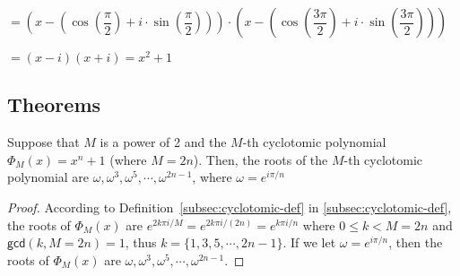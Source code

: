 $= \left(x - \left(\cos\left(\dfrac{\pi}{2}\right) + i \cdot \sin\left(\dfrac{\pi}{2}\right) \right) \right) \cdot \left(x - \left(\cos\left(\dfrac{3\pi}{2}\right) + i \cdot \sin\left(\dfrac{3\pi}{2}\right) \right) \right)$

$= (x - i)(x + i) = x^2 + 1$



\subsection{Theorems}
\label{subsec:cyclotomic-theorem}


\begin{tcolorbox}[title={\textbf{\tboxtheorem{\ref*{subsec:cyclotomic-theorem}.1} Roots of the $M$-th Cyclotomic Polynomial}}]

Suppose that $M$ is a power of 2 and the $M$-th cyclotomic polynomial $\Phi_M(x) = x^n + 1$ (where $M = 2n$). Then, the roots of the $M$-th cyclotomic polynomial are $\omega, \omega^3, \omega^5, \cdots, \omega^{2n-1}$, where $\omega = e^{i\pi/n}$

\end{tcolorbox}

\begin{proof}

According to Definition~\ref*{subsec:cyclotomic-def} in \autoref{subsec:cyclotomic-def}, the roots of $\Phi_M(x)$ are $e^{2k\pi i/M} = e^{2k\pi i/(2n)} = e^{k\pi i/n}$ where $0 \leq k < M = 2n$ and $\textsf{gcd}(k, M = 2n) = 1$, thus $k = \{1, 3, 5, \cdots, 2n-1\}$. If we let $\omega = e^{i\pi/n}$, then the roots of $\Phi_M(x)$ are $\omega, \omega^3, \omega^5, \cdots, \omega^{2n-1}$.

\end{proof}

